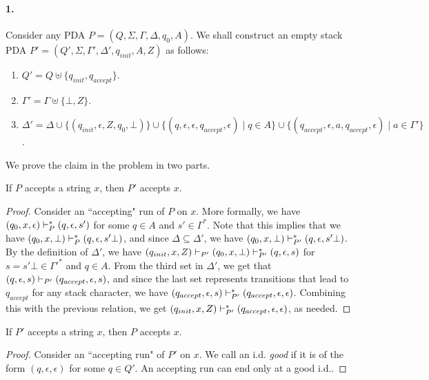 \begin{soln}
    \paragraph{1.} Consider any PDA $P = (Q, \Sigma, \Gamma, \Delta, q_0, A)$. We shall construct an empty stack PDA $P' = (Q', \Sigma, \Gamma', \Delta', q_{init}, A, Z)$ as follows:
    \begin{enumerate}
        \item $Q' = Q \uplus \{q_{init}, q_{accept}\}$.
        \item $\Gamma' = \Gamma \uplus \{\bot, Z\}$.
        \item $\Delta' = \Delta \cup \{(q_{init}, \epsilon, Z, q_0, \bot)\} \cup \{(q, \epsilon, \epsilon, q_{accept}, \epsilon) \mid q \in A\} \cup \{(q_{accept}, \epsilon, a,
            q_{accept}, \epsilon) \mid a \in \Gamma'\}$.
    \end{enumerate}
    We prove the claim in the problem in two parts.\nl
    \begin{claim}
        If $P$ accepts a string $x$, then $P'$ accepts $x$.
    \end{claim}
    \begin{proof}
        Consider an ``accepting" run of $P$ on $x$. More formally, we have $(q_0, x, \epsilon) \vdash_P^* (q, \epsilon, s')$ for some $q \in A$ and $s' \in \Gamma^*$. Note that this implies that we have $(q_0,
        x, \bot) \vdash_P^* (q, \epsilon, s'\bot)$, and since $\Delta \subseteq \Delta'$, we have $(q_0, x, \bot) \vdash_{P'}^* (q, \epsilon, s'\bot)$. By the definition of $\Delta'$, we have
        $(q_{init}, x, Z) \vdash_{P'} (q_0, x, \bot) \vdash_{P'}^* (q, \epsilon, s)$ for $s = s'\bot \in \Gamma'^*$ and $q \in A$. From the third set in $\Delta'$, we get that $(q,
        \epsilon, s) \vdash_{P'} (q_{accept}, \epsilon, s)$, and since the last set represents transitions that lead to $q_{accept}$ for any stack character, we have $(q_{accept},
        \epsilon, s) \vdash_{P'}^* (q_{accept}, \epsilon, \epsilon)$. Combining this with the previous relation, we get $(q_{init}, x, Z) \vdash_{P'}^* (q_{accept}, \epsilon, \epsilon)$, as needed.
    \end{proof}
    \begin{claim}
        If $P'$ accepts a string $x$, then $P$ accepts $x$.
    \end{claim}
    \begin{proof}
        Consider an ``accepting run" of $P'$ on $x$. We call an i.d. \textit{good} if it is of the form $(q, \epsilon, \epsilon)$ for some $q \in Q'$. An accepting run can end only at a good i.d..\nl

\end{proof}
\end{soln}

